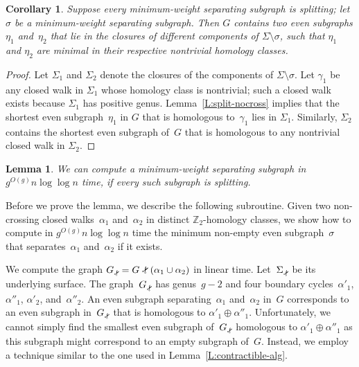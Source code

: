 \documentclass[twoside,leqno,twocolumn]{article}
\def\Z{\mathbb{Z}}
\def\snip{\mathbin{\raisebox{0.15ex}{\rotatebox[origin=c]{60}{\Rightscissors}\!}}}
\def\subsnip{\mathbin{\raisebox{0.15ex}{\rotatebox[origin=c]{60}{\footnotesize\Rightscissors}\!}}}
\def\Gsnip{\mathord{G_{\subsnip}}}
\newtheorem{corollary}[theorem]{Corollary}
\newtheorem{lemma}[theorem]{Lemma}
\begin{document}
\begin{corollary}
\label{C:split}
Suppose every minimum-weight separating subgraph is splitting; let $\sigma$ be a minimum-weight separating subgraph.  Then $G$ contains two even subgraphs $\eta_1$ and~$\eta_2$ that lie in the closures of different components of $\Sigma \setminus \sigma$, such that $\eta_1$ and $\eta_2$ are minimal in their respective nontrivial homology classes.
\end{corollary}


\begin{proof}
  Let $\Sigma_1$ and $\Sigma_2$ denote the closures of the components of
  $\Sigma \setminus \sigma$.  Let $\gamma_1$ be any closed walk in $\Sigma_1$
  whose homology class is nontrivial; such a closed walk exists because
  $\Sigma_1$ has positive genus.  Lemma~\ref{L:split-nocross} implies that
  the shortest even subgraph~$\eta_1$ in $G$ that is homologous to~$\gamma_1$
  lies in $\Sigma_1$.  Similarly, $\Sigma_2$ contains the shortest even
  subgraph of~$G$ that is homologous to any nontrivial closed walk in $\Sigma_2$.
\end{proof}

\begin{lemma}
  \label{L:split-alg}
  We can compute a minimum-weight separating subgraph in $g^{O(g)} n \log \log n$
  time, if every such subgraph is splitting.
\end{lemma}

Before we prove the lemma, we describe the following subroutine.
Given two non-crossing closed walks~$\alpha_1$ and~$\alpha_2$ in
distinct $\Z_2$-homology classes, we show how to compute
in $g^{O(g)}n \log \log n$ time the minimum non-empty even
subgraph~$\sigma$ that separates~$\alpha_1$ and~$\alpha_2$ if it exists.

We compute the graph $\Gsnip = G \snip (\alpha_1\cup \alpha_2)$ in linear
time. Let~$\Sigma_{\subsnip}$ be its underlying surface.
The graph~$\Gsnip$ has genus~$g-2$ and
four boundary cycles~$\alpha'_1$, $\alpha''_1$, $\alpha'_2$,
and~$\alpha''_2$. An even subgraph separating~$\alpha_1$ and~$\alpha_2$
in~$G$ corresponds to an even subgraph in~$\Gsnip$ that is homologous
to $\alpha'_1 \oplus \alpha''_1$. Unfortunately, we cannot simply find the
smallest even subgraph of~$\Gsnip$ homologous to
$\alpha'_1 \oplus \alpha''_1$
as this subgraph might correspond to an empty subgraph of~$G$.  Instead, we employ
a technique similar to the one used in Lemma~\ref{L:contractible-alg}.
\end{document}
